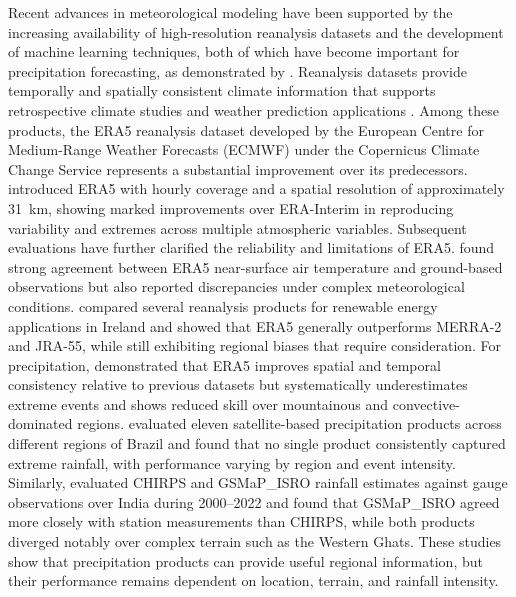 \documentclass[referee,pdflatex,sn-basic]{sn-jnl}%
\theoremstyle{thmstyleone}%
\theoremstyle{thmstyletwo}%
\theoremstyle{thmstylethree}%
\begin{document}
Recent advances in meteorological modeling have been supported by the increasing availability of high-resolution reanalysis datasets and the development of machine learning techniques, both of which have become important for precipitation forecasting, as demonstrated by \citet{10512739}. Reanalysis datasets provide temporally and spatially consistent climate information that supports retrospective climate studies and weather prediction applications \citep{10512483}. Among these products, the ERA5 reanalysis dataset developed by the European Centre for Medium-Range Weather Forecasts (ECMWF) under the Copernicus Climate Change Service represents a substantial improvement over its predecessors. \citet{hersbach2020era5} introduced ERA5 with hourly coverage and a spatial resolution of approximately 31~km, showing marked improvements over ERA-Interim in reproducing variability and extremes across multiple atmospheric variables. Subsequent evaluations have further clarified the reliability and limitations of ERA5. \citet{mcnicholl2021evaluating} found strong agreement between ERA5 near-surface air temperature and ground-based observations but also reported discrepancies under complex meteorological conditions. \citet{doddy2021reanalysis} compared several reanalysis products for renewable energy applications in Ireland and showed that ERA5 generally outperforms MERRA-2 and JRA-55, while still exhibiting regional biases that require consideration. For precipitation, \citet{lavers2022evaluation} demonstrated that ERA5 improves spatial and temporal consistency relative to previous datasets but systematically underestimates extreme events and shows reduced skill over mountainous and convective-dominated regions. \citet{palharini2021assessment} evaluated eleven satellite-based precipitation products across different regions of Brazil and found that no single product consistently captured extreme rainfall, with performance varying by region and event intensity. Similarly, \citet{kumar2025long} evaluated CHIRPS and GSMaP\_ISRO rainfall estimates against gauge observations over India during 2000--2022 and found that GSMaP\_ISRO agreed more closely with station measurements than CHIRPS, while both products diverged notably over complex terrain such as the Western Ghats. These studies show that precipitation products can provide useful regional information, but their performance remains dependent on location, terrain, and rainfall intensity.
\end{document}
